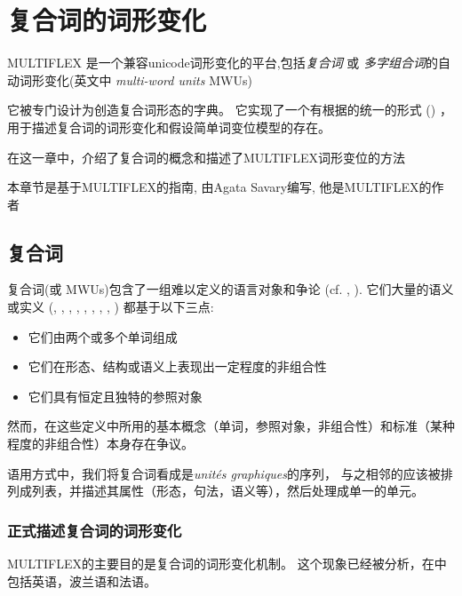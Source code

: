 \chapter{复合词的词形变化}

\label{chap-multiflex}
MULTIFLEX 是一个兼容unicode词形变化的平台,包括\textit{复合词}
或 \textit{多字组合词}的自动词形变化(英文中 \textit{multi-word units} MWUs)

它被专门设计为创造复合词形态的字典。
它实现了一个有根据的统一的形式 (\cite{Savary05}) ，
用于描述复合词的词形变化和假设简单词变位模型的存在。

\bigskip
\noindent 在这一章中，介绍了复合词的概念和描述了MULTIFLEX词形变位的方法

\bigskip
\noindent 本章节是基于MULTIFLEX的指南, 由Agata Savary编写, 他是MULTIFLEX的作者

\section{复合词}
\label{section:MWUs}
复合词(或 MWUs)包含了一组难以定义的语言对象和争论  (cf. \cite{HabertJacquemin93}, \cite{Corbin92}). 
它们大量的语义或实义 (\cite{Benven74}, \cite{Downing77}, \cite{Levi78}, 
\cite{Bauer83}, \cite{Gross90}, \cite{Anscombre90}, \cite{max-1993},
\cite{Gross96}, \cite{Cadiot92}) 都基于以下三点:

\begin{itemize}
\item 它们由两个或多个单词组成
\item 它们在形态、结构或语义上表现出一定程度的非组合性
\item 它们具有恒定且独特的参照对象
\end{itemize}

\bigskip
\noindent 然而，在这些定义中所用的基本概念（单词，参照对象，非组合性）和标准（某种程度的非组合性）本身存在争议。

\bigskip
\noindent 语用方式中，我们将复合词看成是\textit{unités graphiques}的序列，
与之相邻的应该被排列成列表，并描述其属性（形态，句法，语义等），然后处理成单一的单元。

 \subsection{正式描述复合词的词形变化}
\label{subsec:MWUs inflection}
MULTIFLEX的主要目的是复合词的词形变化机制。
这个现象已经被分析，在\cite{these-Savary}中包括英语，波兰语和法语。


